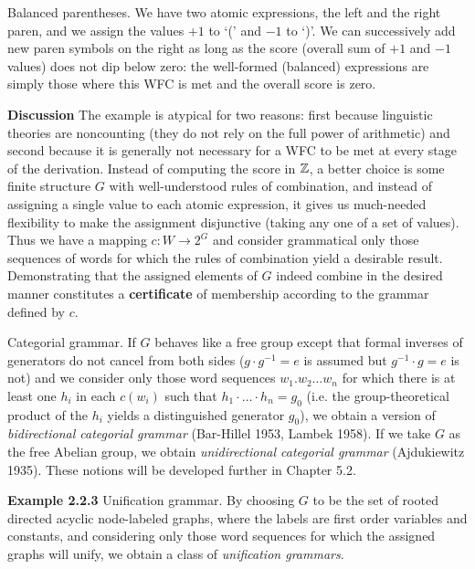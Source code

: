 \smallskip{} Balanced parentheses. We have two
atomic expressions, the left and the right paren, and we assign the values
$+1$ to `(' and $-1$ to `)'.  We can successively add new paren symbols on the
right as long as the score (overall sum of $+1$ and $-1$ values) does not dip
below zero: the well-formed (balanced) expressions are simply those where this
WFC is met and the overall score is zero.

\smallskip\noindent 
{\bf Discussion} The example is atypical for two reasons: first because
linguistic theories are noncounting (they do not rely on the full power of
arithmetic) and second because it is generally not necessary for a WFC to be
met at every stage of the derivation. Instead of computing the score in ${\Bbb
Z}$, a better choice is some finite structure $G$ with well-understood rules of
combination, and instead of assigning a single value to each atomic
expression, it gives us much-needed flexibility to make the assignment
disjunctive (taking any one of a set of values). Thus we have a mapping $c: W
\rightarrow 2^G$ and consider grammatical only those sequences of words for
which the rules of combination yield a desirable result.  Demonstrating that
the assigned elements of $G$ indeed combine in the desired manner constitutes
a {\bf certificate} of membership according to the grammar defined by $c$.

\smallskip{} Categorial grammar. If $G$ behaves
like a free group except that formal inverses of generators do not cancel from
both sides ($g \cdot g^{-1} = e$ is assumed but $g^{-1} \cdot g = e$ is not)
and we consider only those word sequences $w_1 .  w_2 \ldots w_n$ for which
there is at least one $h_i$ in each $c(w_i)$ such that $h_1 \cdot \ldots \cdot
h_n = g_0$ (i.e.  the group-theoretical product of the $h_i$ yields a
distinguished generator $g_0$), we obtain a version of {\it bidirectional
  categorial grammar} (Bar-Hillel
1953, Lambek 1958). If we take $G$ as the free Abelian group, we obtain {\it
  unidirectional categorial grammar}
(Ajdukiewitz 1935).\nocite{Bar-Hillel:1953}\nocite{Lambek:1958}
\nocite{Ajdukiewicz:1935} These notions will be developed further in Chapter
5.2.

\smallskip\noindent 
{\bf Example 2.2.3} Unification grammar. By choosing $G$ to be the set of
rooted directed acyclic node-labeled graphs, where the labels are first order
variables and constants, and considering only those word sequences for which
the assigned graphs will unify, we obtain a class of {\it unification
grammars}.  

